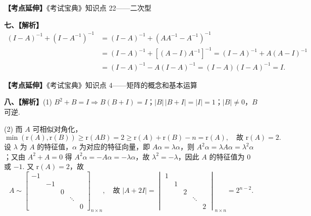 \documentclass[a4paper,11pt]{ctexart}
\newcommand{\rk}{\mathrm{r}}
\begin{document}
\textbf{【考点延伸】}《考试宝典》知识点 22——二次型

\vspace{0.8em}

\textbf{七、【解析】}
\begin{align*}
  (I - A)^{-1} + (I - A^{-1})^{-1}
  &= (I - A)^{-1} + (AA^{-1} - A^{-1})^{-1} \\
  &= (I - A)^{-1} + [(A - I)A^{-1}]^{-1}
  = (I - A)^{-1} + A(A - I)^{-1} \\
  &= (I - A)^{-1} - A(I - A)^{-1}
  = (I - A)(I - A)^{-1} = I.
\end{align*}

\textbf{【考点延伸】}《考试宝典》知识点 4——矩阵的概念和基本运算

\vspace{0.8em}

\textbf{八、【解析】}(1) $B^2 + B = I \Rightarrow B(B + I) = I$；$|B|\,|B + I| = |I| = 1$；$|B| \neq 0$，$B$ 可逆.

(2) 而 $A$ 可相似对角化，
\[
  \min(\rk(A), \rk(B)) \geqslant \rk(AB) = 2 \geqslant \rk(A) + \rk(B) - n = \rk(A), \quad\text{故 } \rk(A) = 2.
\]
设 $\lambda$ 为 $A$ 的特征值，$\alpha$ 为对应的特征向量，即 $A\alpha = \lambda \alpha$，则 $A^2 \alpha = \lambda A \alpha = \lambda^2 \alpha$；又由 $A^2 + A = 0$ 得 $A^2 \alpha = -A\alpha = -\lambda \alpha$，故 $\lambda^2 = -\lambda$，因此 $A$ 的特征值为 $0$ 或 $-1$. 又 $\rk(A) = 2$，故
\[
  A \sim \begin{bmatrix}
    -1 & & & & \\
    & -1 & & & \\
    & & 0 & & \\
    & & & \ddots & \\
    & & & & 0
  \end{bmatrix}_{n \times n},
  \quad\text{故 }
  |A + 2I| = \begin{vmatrix}
    1 & & & & \\
    & 1 & & & \\
    & & 2 & & \\
    & & & \ddots & \\
    & & & & 2
  \end{vmatrix}_{n \times n} = 2^{n - 2}.
\]
\end{document}
